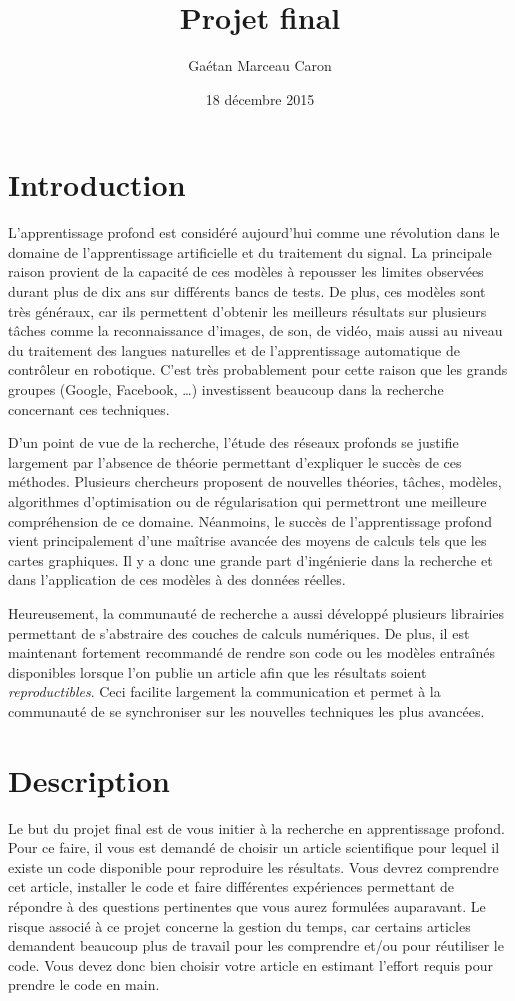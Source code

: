 \documentclass{article}
\title{Projet final}
\author{Gaétan Marceau Caron}
\date{18 décembre 2015}
\begin{document}
\maketitle

\section{Introduction}
L'apprentissage profond est considéré aujourd'hui comme une révolution dans le domaine de l'apprentissage artificielle et du traitement du signal.
La principale raison provient de la capacité de ces modèles à repousser les limites observées durant plus de dix ans sur différents bancs de tests. 
De plus, ces modèles sont très généraux, car ils permettent d'obtenir les meilleurs résultats sur plusieurs tâches comme la reconnaissance d'images, de son, de vidéo, mais aussi au niveau du traitement des langues naturelles et de l'apprentissage automatique de contrôleur en robotique.
C'est très probablement pour cette raison que les grands groupes (Google, Facebook, \dots) investissent beaucoup dans la recherche concernant ces techniques.

D'un point de vue de la recherche, l'étude des réseaux profonds se justifie largement par l'absence de théorie permettant d'expliquer le succès de ces méthodes.
Plusieurs chercheurs proposent de nouvelles théories, tâches, modèles, algorithmes d'optimisation ou de régularisation qui permettront une meilleure compréhension de ce domaine.
Néanmoins, le succès de l'apprentissage profond vient principalement d'une maîtrise avancée des moyens de calculs tels que les cartes graphiques.
Il y a donc une grande part d'ingénierie dans la recherche et dans l'application de ces modèles à des données réelles.

Heureusement, la communauté de recherche a aussi développé plusieurs librairies permettant de s'abstraire des couches de calculs numériques.
De plus, il est maintenant fortement recommandé de rendre son code ou les modèles entraînés disponibles lorsque l'on publie un article afin que les résultats soient {\em reproductibles}. 
Ceci facilite largement la communication et permet à la communauté de se synchroniser sur les nouvelles techniques les plus avancées. 

\newpage 
\section{Description}
Le but du projet final est de vous initier à la recherche en apprentissage profond.
Pour ce faire, il vous est demandé de choisir un article scientifique pour lequel il existe un code disponible pour reproduire les résultats.
Vous devrez comprendre cet article, installer le code et faire différentes expériences permettant de répondre à des questions pertinentes que vous aurez formulées auparavant.
Le risque associé à ce projet concerne la gestion du temps, car certains articles demandent beaucoup plus de travail pour les comprendre et/ou pour réutiliser le code.
Vous devez donc bien choisir votre article en estimant l'effort requis pour prendre le code en main.
\end{document}
